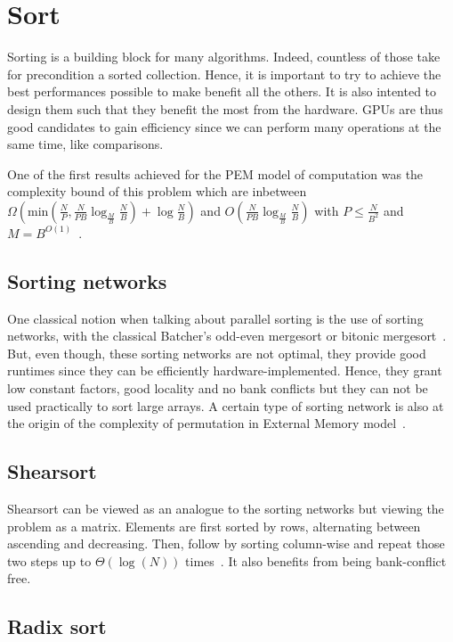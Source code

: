 
\section{Sort}

Sorting is a building block for many algorithms. Indeed, countless of those take for precondition a sorted collection. Hence, it is important to try to achieve the best performances possible to make benefit all the others. It is also intented to design them such that they benefit the most from the hardware. GPUs are thus good candidates to gain efficiency since we can perform many operations at the same time, like comparisons.

One of the first results achieved for the PEM model of computation was the complexity bound of this problem which are inbetween $\Omega(\text{min}(\frac{N}{P}, \frac{N}{PB} \log_{\frac{M}{B}} \frac{N}{B}) + \log \frac{N}{B})$ and $O(\frac{N}{PB} \log_{\frac{M}{B}} \frac{N}{B})$ with $P \leq \frac{N}{B^{2}}$ and $M = B^{O(1)}$~\cite{arge2008fundamental}.

\subsection{Sorting networks}

One classical notion when talking about parallel sorting is the use of sorting networks, with the classical Batcher's odd-even mergesort or bitonic mergesort~\cite{batcher1968sorting}. But, even though, these sorting networks are not optimal, they provide good runtimes since they can be efficiently hardware-implemented. Hence, they grant low constant factors, good locality and no bank conflicts but they can not be used practically to sort large arrays. A certain type of sorting network is also at the origin of the complexity of permutation in External Memory model~\cite{jia1981complexity}.

\subsection{Shearsort}

Shearsort can be viewed as an analogue to the sorting networks but viewing the problem as a matrix. Elements are first sorted by rows, alternating between ascending and decreasing. Then, follow by sorting column-wise and repeat those two steps up to $\Theta(\log(N))$ times~\cite{sitchinava2013provably}. It also benefits from being bank-conflict free.

\subsection{Radix sort}

